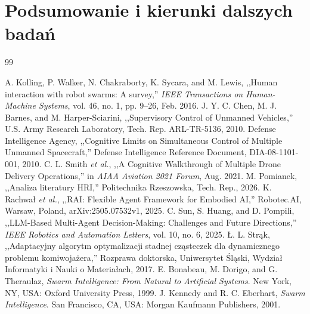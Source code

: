 \documentclass[12pt,a4paper,twoside]{report}
\theoremstyle{definition} %
\begin{document}
\chapter*{Podsumowanie i kierunki dalszych badań}
    \begin{thebibliography}{99}

 A. Kolling, P. Walker, N. Chakraborty, K. Sycara, and M. Lewis, ,,Human interaction with robot swarms: A survey,'' \emph{IEEE Transactions on Human-Machine Systems}, vol. 46, no. 1, pp. 9--26, Feb. 2016.
 J. Y. C. Chen, M. J. Barnes, and M. Harper-Sciarini, ,,Supervisory Control of Unmanned Vehicles,'' U.S. Army Research Laboratory, Tech. Rep. ARL-TR-5136, 2010.
 Defense Intelligence Agency, ,,Cognitive Limits on Simultaneous Control of Multiple Unmanned Spacecraft,'' Defense Intelligence Reference Document, DIA-08-1101-001, 2010.
 C. L. Smith \textit{et al.}, ,,A Cognitive Walkthrough of Multiple Drone Delivery Operations,'' in \emph{AIAA Aviation 2021 Forum}, Aug. 2021.
 M. Pomianek, ,,Analiza literatury HRI,'' Politechnika Rzeszowska, Tech. Rep., 2026.
 K. Rachwał \textit{et al.}, ,,RAI: Flexible Agent Framework for Embodied AI,'' Robotec.AI, Warsaw, Poland, arXiv:2505.07532v1, 2025.
 C. Sun, S. Huang, and D. Pompili, ,,LLM-Based Multi-Agent Decision-Making: Challenges and Future Directions,'' \emph{IEEE Robotics and Automation Letters}, vol. 10, no. 6, 2025.
 Ł. L. Strąk, ,,Adaptacyjny algorytm optymalizacji stadnej cząsteczek dla dynamicznego problemu komiwojażera,'' Rozprawa doktorska, Uniwersytet Śląski, Wydział Informatyki i Nauki o Materiałach, 2017.
 E. Bonabeau, M. Dorigo, and G. Theraulaz, \emph{Swarm Intelligence: From Natural to Artificial Systems}. New York, NY, USA: Oxford University Press, 1999.
 J. Kennedy and R. C. Eberhart, \emph{Swarm Intelligence}. San Francisco, CA, USA: Morgan Kaufmann Publishers, 2001.

\end{thebibliography}
    \cleardoublepage

\end{document}
